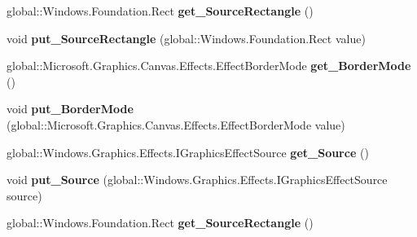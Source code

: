\begin{DoxyCompactItemize}
global\+::\+Windows.\+Foundation.\+Rect {\bfseries get\+\_\+\+Source\+Rectangle} ()
\item 
\mbox{\label{interface_microsoft_1_1_graphics_1_1_canvas_1_1_effects_1_1_i_crop_effect_ad88fede8cf2dfab050189939a47de349}} 
void {\bfseries put\+\_\+\+Source\+Rectangle} (global\+::\+Windows.\+Foundation.\+Rect value)
\item 
\mbox{\label{interface_microsoft_1_1_graphics_1_1_canvas_1_1_effects_1_1_i_crop_effect_aedc53db53d8d6e57c40517ab6a3758d0}} 
global\+::\+Microsoft.\+Graphics.\+Canvas.\+Effects.\+Effect\+Border\+Mode {\bfseries get\+\_\+\+Border\+Mode} ()
\item 
\mbox{\label{interface_microsoft_1_1_graphics_1_1_canvas_1_1_effects_1_1_i_crop_effect_ae88c621641cd9be11414409037414d5e}} 
void {\bfseries put\+\_\+\+Border\+Mode} (global\+::\+Microsoft.\+Graphics.\+Canvas.\+Effects.\+Effect\+Border\+Mode value)
\item 
\mbox{\label{interface_microsoft_1_1_graphics_1_1_canvas_1_1_effects_1_1_i_crop_effect_ae17d9daa0439d30e16235dde28fde47d}} 
global\+::\+Windows.\+Graphics.\+Effects.\+I\+Graphics\+Effect\+Source {\bfseries get\+\_\+\+Source} ()
\item 
\mbox{\label{interface_microsoft_1_1_graphics_1_1_canvas_1_1_effects_1_1_i_crop_effect_aad283c62ebd28ad1ba136787595806fa}} 
void {\bfseries put\+\_\+\+Source} (global\+::\+Windows.\+Graphics.\+Effects.\+I\+Graphics\+Effect\+Source source)
\item 
\mbox{\label{interface_microsoft_1_1_graphics_1_1_canvas_1_1_effects_1_1_i_crop_effect_afc0de3bee5f831a8dfac30ecac6a898d}} 
global\+::\+Windows.\+Foundation.\+Rect {\bfseries get\+\_\+\+Source\+Rectangle} ()
\item 
\mbox{\label{interface_microsoft_1_1_graphics_1_1_canvas_1_1_effects_1_1_i_crop_effect_ad88fede8cf2dfab050189939a47de349}} 

\end{DoxyCompactItemize}

